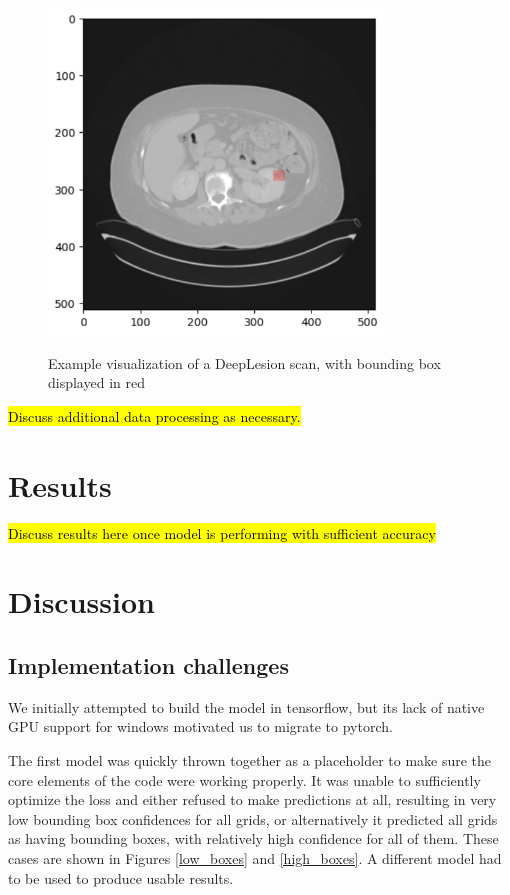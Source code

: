\begin{figure}
 \begin{center}
 \includegraphics[width=3.5in]{images/example_scan.png}\\
 \caption{Example visualization of a DeepLesion scan, with bounding box displayed in red}\label{example_scan}
 \end{center}
\end{figure}

\hl{Discuss additional data processing as necessary.}

\section{Results}
\hl{Discuss results here once model is performing with sufficient accuracy}

\section{Discussion}
\subsection{Implementation challenges}
We initially attempted to build the model in tensorflow, but its lack of native GPU support for windows motivated us to migrate to pytorch. 

The first model was quickly thrown together as a placeholder to make sure the core elements of the code were working properly. It was unable to sufficiently optimize the loss and either refused to make predictions at all, resulting in very low bounding box confidences for all grids, or alternatively it predicted all grids as having bounding boxes, with relatively high confidence for all of them. These cases are shown in Figures \ref{low_boxes} and \ref{high_boxes}. A different model had to be used to produce usable results.

